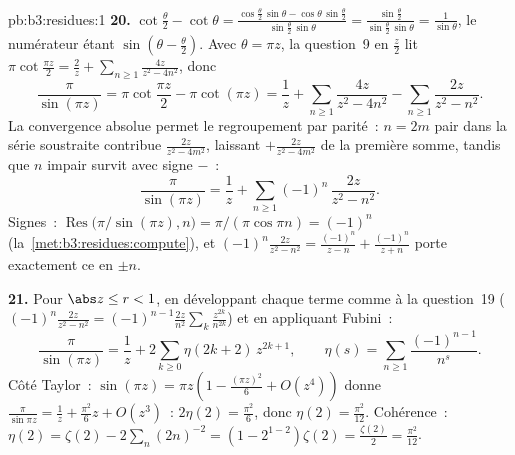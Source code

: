 \begin{solution}{pb:b3:residues:1}
\textbf{20.} $\cot\frac\theta2 - \cot\theta =
\frac{\cos\frac\theta2\,\sin\theta -
\cos\theta\,\sin\frac\theta2}{\sin\frac\theta2\,\sin\theta}
= \frac{\sin\frac\theta2}{\sin\frac\theta2\,\sin\theta} =
\frac1{\sin\theta}$, le numérateur étant $\sin(\theta -
\frac\theta2)$. Avec $\theta = \pi z$, la question~9 en
$\frac z2$ lit $\pi\cot\frac{\pi z}2 = \frac2z +
\sum_{n\geq1}\frac{4z}{z^2 - 4n^2}$, donc
\[
\frac{\pi}{\sin(\pi z)}
= \pi\cot\frac{\pi z}2 - \pi\cot(\pi z)
= \frac1z + \sum_{n\geq1}\frac{4z}{z^2 - 4n^2}
- \sum_{n\geq1}\frac{2z}{z^2 - n^2} .
\]
La convergence absolue permet le regroupement par parité~:
$n = 2m$ pair dans la série soustraite contribue
$\frac{2z}{z^2-4m^2}$, laissant $+\frac{2z}{z^2-4m^2}$ de
la première somme, tandis que $n$ impair survit avec signe
$-$~:
\[
\frac{\pi}{\sin(\pi z)} = \frac1z +
\sum_{n\geq1}(-1)^n\,\frac{2z}{z^2 - n^2} .
\]
Signes~: $\operatorname{Res}\bigl(\pi/\sin(\pi z), n\bigr)
= \pi/(\pi\cos\pi n) = (-1)^n$
(la~\cref{met:b3:residues:compute}), et
$(-1)^n\frac{2z}{z^2 - n^2} = \frac{(-1)^n}{z-n} +
\frac{(-1)^n}{z+n}$ porte exactement ce  en $\pm n$.

\textbf{21.} Pour $\abs z \leq r < 1$, en développant chaque
terme comme à la question~19
($(-1)^n\frac{2z}{z^2-n^2} =
(-1)^{n-1}\frac{2z}{n^2}\sum_k\frac{z^{2k}}{n^{2k}}$) et
en appliquant Fubini~:
\[
\frac{\pi}{\sin(\pi z)} = \frac1z +
2\sum_{k\geq0}\eta(2k+2)\,z^{2k+1},
\qquad
\eta(s) = \sum_{n\geq1}\frac{(-1)^{n-1}}{n^s} .
\]
Côté Taylor~: $\sin(\pi z) = \pi z(1 - \frac{(\pi z)^2}6 +
O(z^4))$ donne $\frac\pi{\sin\pi z} = \frac1z +
\frac{\pi^2}6z + O(z^3)$~: $2\eta(2) = \frac{\pi^2}6$, donc
$\eta(2) = \frac{\pi^2}{12}$. Cohérence~: $\eta(2) =
\zeta(2) - 2\sum_n(2n)^{-2} = (1 - 2^{1-2})\zeta(2) =
\frac{\zeta(2)}2 = \frac{\pi^2}{12}$.


\end{solution}
